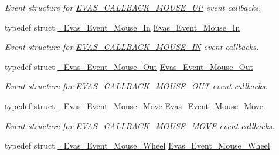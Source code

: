 \begin{DoxyCompactItemize}
\begin{DoxyCompactList}\small\item\em Event structure for \hyperlink{Evas_8h_a99e208e463a20499aabe6faac8a8cb8aa8c1b22c99dd0231cd9ba1fecbffffac7}{EVAS\_\-CALLBACK\_\-MOUSE\_\-UP} event callbacks. \item\end{DoxyCompactList}\item 
typedef struct \hyperlink{struct__Evas__Event__Mouse__In}{\_\-Evas\_\-Event\_\-Mouse\_\-In} \hyperlink{Evas_8h_a9b42da2562eb8390dd513d7337b1e018}{Evas\_\-Event\_\-Mouse\_\-In}\label{Evas_8h_a9b42da2562eb8390dd513d7337b1e018}

\begin{DoxyCompactList}\small\item\em Event structure for \hyperlink{Evas_8h_a99e208e463a20499aabe6faac8a8cb8aa598c57bc146639618157159a319f11af}{EVAS\_\-CALLBACK\_\-MOUSE\_\-IN} event callbacks. \item\end{DoxyCompactList}\item 
typedef struct \hyperlink{struct__Evas__Event__Mouse__Out}{\_\-Evas\_\-Event\_\-Mouse\_\-Out} \hyperlink{Evas_8h_a7a168fcb1c4b6bc53ac4e69f5424f317}{Evas\_\-Event\_\-Mouse\_\-Out}\label{Evas_8h_a7a168fcb1c4b6bc53ac4e69f5424f317}

\begin{DoxyCompactList}\small\item\em Event structure for \hyperlink{Evas_8h_a99e208e463a20499aabe6faac8a8cb8aa91aaa30a57047d0ee8a734e603751c25}{EVAS\_\-CALLBACK\_\-MOUSE\_\-OUT} event callbacks. \item\end{DoxyCompactList}\item 
typedef struct \hyperlink{struct__Evas__Event__Mouse__Move}{\_\-Evas\_\-Event\_\-Mouse\_\-Move} \hyperlink{Evas_8h_a224de88869fe5315ca144ef8a2946827}{Evas\_\-Event\_\-Mouse\_\-Move}\label{Evas_8h_a224de88869fe5315ca144ef8a2946827}

\begin{DoxyCompactList}\small\item\em Event structure for \hyperlink{Evas_8h_a99e208e463a20499aabe6faac8a8cb8aa23fb97fb7cbccded54ccf3fc4e1dab8a}{EVAS\_\-CALLBACK\_\-MOUSE\_\-MOVE} event callbacks. \item\end{DoxyCompactList}\item 
typedef struct \hyperlink{struct__Evas__Event__Mouse__Wheel}{\_\-Evas\_\-Event\_\-Mouse\_\-Wheel} \hyperlink{Evas_8h_a54d0e99e450e158924b06746544bb4dc}{Evas\_\-Event\_\-Mouse\_\-Wheel}\label{Evas_8h_a54d0e99e450e158924b06746544bb4dc}


\end{DoxyCompactItemize}
